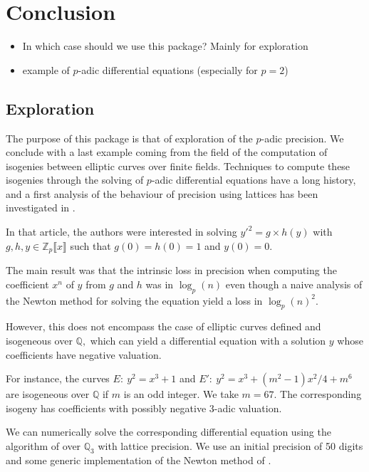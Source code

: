 \documentclass[sigconf]{acmart}
\theoremstyle{definition}
\begin{document}
\section{Conclusion}

\begin{itemize}
\item In which case should we use this package? Mainly for exploration
\item example of $p$-adic differential equations (especially for $p=2$)
\end{itemize}

\subsection{Exploration}

The purpose of this package is that of exploration
of the $p$-adic precision.
We conclude with a last example coming
from the field of the computation of
isogenies between elliptic curves over finite fields.
Techniques to compute these isogenies
through the solving of $p$-adic differential equations
have a long history, and a first
analysis of the behaviour of precision using
lattices has been investigated in \cite{LV16}.

In that article, the authors were interested in
solving $y'^2=g \times h(y)$ with
$g,h,y \in \mathbb{Z}_p \llbracket x \rrbracket$
such that $g(0)=h(0)=1$ and $y(0)=0.$

The main result was that the intrinsic loss in precision
when computing the coefficient $x^n$ of $y$
from $g$ and $h$ was in $\log_p(n)$
even though a naive analysis of
the Newton method for solving the equation
yield a loss in $\log_p(n)^2.$

However, this does not encompass the case of 
elliptic curves defined and isogeneous 
over $\mathbb{Q},$ which can yield a differential 
equation with a solution $y$ whose coefficients
have negative valuation.

For instance, the curves 
$E: \: y^2=x^3+1$
and $E': \: y^2= x^3+ (m^2-1)x^2/4 + m^6$ are isogeneous
over $\mathbb{Q}$ if  $m$ is an odd integer.
We take $m=67.$ The corresponding isogeny has coefficients with possibly
negative $3$-adic valuation.

We can numerically solve 
the corresponding differential equation
using the algorithm of \cite{Lercier-Sirvent:08}
over $\mathbb{Q}_3$ with lattice precision.
We use an initial precision of 50 digits
and some generic implementation of the Newton
method of \cite{Lercier-Sirvent:08}.
\end{document}
